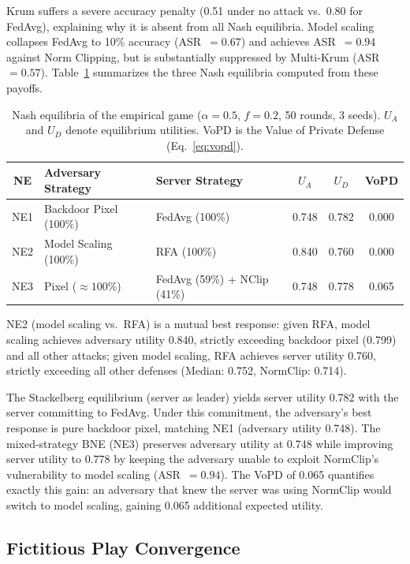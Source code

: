 \documentclass{article}
\begin{document}
Krum suffers a severe accuracy penalty (0.51 under no attack vs.\ 0.80 for FedAvg), explaining why it is absent from all Nash equilibria. Model scaling collapses FedAvg to 10\% accuracy (ASR~$= 0.67$) and achieves ASR~$= 0.94$ against Norm Clipping, but is substantially suppressed by Multi-Krum (ASR~$= 0.57$). Table~\ref{tab:equilibria} summarizes the three Nash equilibria computed from these payoffs.

\begin{table}[t]
\caption{Nash equilibria of the empirical game ($\alpha=0.5$, $f=0.2$, 50 rounds, 3 seeds). $U_A$ and $U_D$ denote equilibrium utilities. VoPD is the Value of Private Defense (Eq.~\ref{eq:vopd}).}
\label{tab:equilibria}
\centering
\small
\begin{tabular}{c|ll|cc|c}
\toprule
\textbf{NE} & \textbf{Adversary Strategy} & \textbf{Server Strategy} & $U_A$ & $U_D$ & VoPD \\
\midrule
NE1 & Backdoor Pixel (100\%) & FedAvg (100\%) & 0.748 & 0.782 & 0.000 \\
NE2 & Model Scaling (100\%) & RFA (100\%) & 0.840 & 0.760 & 0.000 \\
NE3 & Pixel (${\approx}100\%$) & FedAvg (59\%) + NClip (41\%) & 0.748 & 0.778 & 0.065 \\
\bottomrule
\end{tabular}
\end{table}

NE2 (model scaling vs.\ RFA) is a mutual best response: given RFA, model scaling achieves adversary utility 0.840, strictly exceeding backdoor pixel (0.799) and all other attacks; given model scaling, RFA achieves server utility 0.760, strictly exceeding all other defenses (Median: 0.752, NormClip: 0.714).

The Stackelberg equilibrium (server as leader) yields server utility 0.782 with the server committing to FedAvg. Under this commitment, the adversary's best response is pure backdoor pixel, matching NE1 (adversary utility 0.748). The mixed-strategy BNE (NE3) preserves adversary utility at 0.748 while improving server utility to 0.778 by keeping the adversary unable to exploit NormClip's vulnerability to model scaling (ASR~$= 0.94$). The VoPD of 0.065 quantifies exactly this gain: an adversary that knew the server was using NormClip would switch to model scaling, gaining 0.065 additional expected utility.

\subsection{Fictitious Play Convergence}
\end{document}
